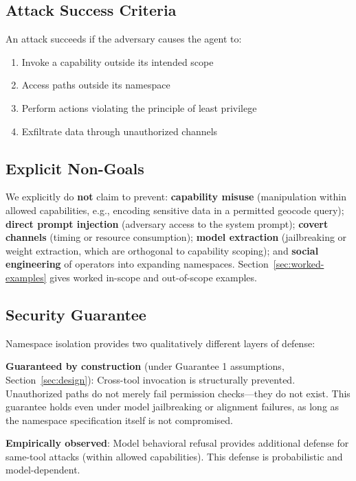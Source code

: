 \documentclass{article}
\begin{document}
\subsection{Attack Success Criteria}

An attack succeeds if the adversary causes the agent to:
\begin{enumerate}
    \item Invoke a capability outside its intended scope
    \item Access paths outside its namespace
    \item Perform actions violating the principle of least privilege
    \item Exfiltrate data through unauthorized channels
\end{enumerate}

\subsection{Explicit Non-Goals}
\label{sec:non-goals}

We explicitly do \textbf{not} claim to prevent: \textbf{capability misuse} (manipulation within allowed capabilities, e.g., encoding sensitive data in a permitted geocode query); \textbf{direct prompt injection} (adversary access to the system prompt); \textbf{covert channels} (timing or resource consumption); \textbf{model extraction} (jailbreaking or weight extraction, which are orthogonal to capability scoping); and \textbf{social engineering} of operators into expanding namespaces. Section~\ref{sec:worked-examples} gives worked in-scope and out-of-scope examples.

\subsection{Security Guarantee}

Namespace isolation provides two qualitatively different layers of defense:

\textbf{Guaranteed by construction} (under Guarantee 1 assumptions, Section~\ref{sec:design}): Cross-tool invocation is structurally prevented. Unauthorized paths do not merely fail permission checks---they do not exist. This guarantee holds even under model jailbreaking or alignment failures, as long as the namespace specification itself is not compromised.

\textbf{Empirically observed}: Model behavioral refusal provides additional defense for same-tool attacks (within allowed capabilities). This defense is probabilistic and model-dependent.
\end{document}
